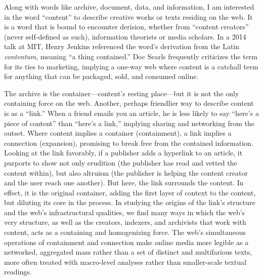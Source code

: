 Along with words like archive, document, data, and information, I am interested in the word ``content'' to describe creative works or texts residing on the web. It is a word that is bound to encounter derision, whether from ``content creators'' (never self-defined as such), information theorists or media scholars. In a 2014 talk at MIT, Henry Jenkins referenced the word's derivation from the Latin \emph{contentum}, meaning ``a thing contained.''\autocite{whitacre_podcast:_2014-1} Doc Searls frequently criticizes the term for its ties to marketing, implying a one-way web where content is a catchall term for anything that can be packaged, sold, and consumed online.\autocite{searls_earth_2014}

The archive is the container---content's resting place---but it is not the only containing force on the web. Another, perhaps friendlier way to describe content is as a ``link.'' When a friend emails you an article, he is less likely to say ``here's a piece of content'' than ``here's a link,'' implying sharing and networking from the outset. Where content implies a container (containment), a link implies a connection (expansion), promising to break free from the contained information. Looking at the link favorably, if a publisher adds a hyperlink to an article, it purports to show not only erudition (the publisher has read and vetted the content within), but also altruism (the publisher is helping the content creator and the user reach one another). But here, the link surrounds the content. In effect, it is the original container, adding the first layer of context to the content, but diluting its core in the process. In studying the origins of the link's structure and the web's infrastructural qualities, we find many ways in which the web's very structure, as well as the creators, indexers, and archivists that work with content, acts as a containing and homogenizing force. The web's simultaneous operations of containment and connection make online media more legible as a networked, aggregated mass rather than a set of distinct and multifarious texts, more often treated with macro-level analyses rather than smaller-scale textual readings.



